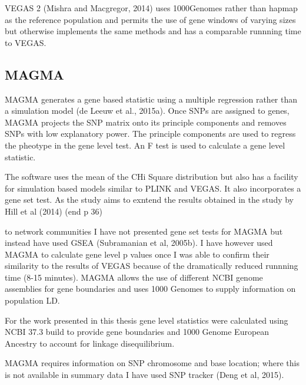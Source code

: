VEGAS 2 (Mishra and Macgregor, 2014) uses 1000Genomes rather than hapmap as the reference population and permits the use of gene windows of varying sizes but otherwise implements the same methods and has a comparable runnning time to VEGAS.

\subsection{MAGMA}
\label{sec:MAGMA_gene_scores}
MAGMA generates a gene based statistic using a multiple regression rather than a simulation model (de Leeuw et al., 2015a). Once SNPs are assigned to genes, MAGMA projects the SNP matrix onto its principle components and removes SNPs with low explanatory power. The principle components are used to regress the pheotype in the gene level test. An F test is used to calculate a gene level statistic. 

The software uses the mean of the CHi Square distribution but also has a facility for simulation based models similar to PLINK and VEGAS. It also incorporates a gene set test. As the study aims to exntend the results obtained in the study by Hill et al (2014) (end p 36)

to network communities I have not presented gene set tests for MAGMA but instead have used GSEA (Subramanian et al, 2005b). I have however used MAGMA to calculate gene level p values once I was able to confirm their similarity to the results of VEGAS because of the dramatically reduced runnning time (8-15 minutes).
MAGMA allows the use of different NCBI genome assemblies for gene boundaries and uses 1000 Genomes to supply information on population LD.

For the work presented in this thesis gene level statistics were calculated using NCBI 37.3 build to provide gene boundaries and 1000 Genome European Ancestry to account for linkage disequilibrium. 


MAGMA requires information on SNP chromosome and base location; where this is not available in summary data I have used SNP tracker (Deng et al, 2015).

